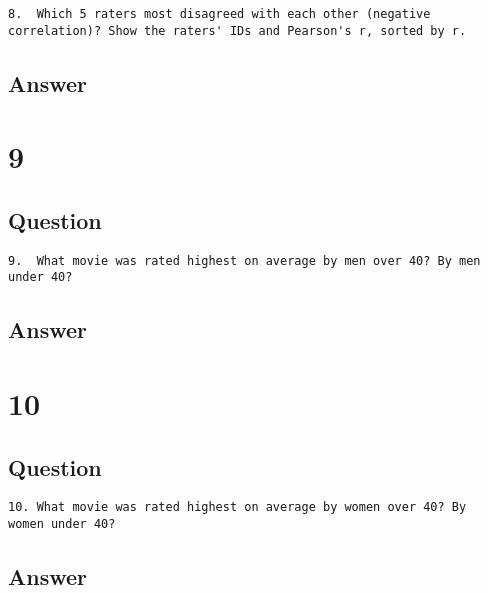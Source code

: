 \documentclass[letterpaper,11pt]{article}
\begin{document}
\begin{verbatim}
8.  Which 5 raters most disagreed with each other (negative
correlation)? Show the raters' IDs and Pearson's r, sorted by r.
\end{verbatim}

\newpage
\subsection*{Answer}

\newpage

\section*{9}

\subsection*{Question}

\begin{verbatim}
9.  What movie was rated highest on average by men over 40? By men
under 40?
\end{verbatim}

\newpage
\subsection*{Answer}

\newpage

\section*{10}

\subsection*{Question}

\begin{verbatim}
10. What movie was rated highest on average by women over 40? By
women under 40?
\end{verbatim}

\newpage
\subsection*{Answer}




\clearpage


\end{document}
